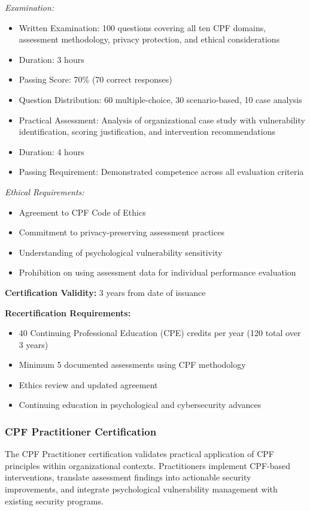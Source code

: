 \documentclass[11pt,a4paper]{article}
\begin{document}
\textit{Examination:}
\begin{itemize}
\item Written Examination: 100 questions covering all ten CPF domains, assessment methodology, privacy protection, and ethical considerations
\item Duration: 3 hours
\item Passing Score: 70\% (70 correct responses)
\item Question Distribution: 60 multiple-choice, 30 scenario-based, 10 case analysis
\item Practical Assessment: Analysis of organizational case study with vulnerability identification, scoring justification, and intervention recommendations
\item Duration: 4 hours
\item Passing Requirement: Demonstrated competence across all evaluation criteria
\end{itemize}

\textit{Ethical Requirements:}
\begin{itemize}
\item Agreement to CPF Code of Ethics
\item Commitment to privacy-preserving assessment practices
\item Understanding of psychological vulnerability sensitivity
\item Prohibition on using assessment data for individual performance evaluation
\end{itemize}

\textbf{Certification Validity:} 3 years from date of issuance

\textbf{Recertification Requirements:}
\begin{itemize}
\item 40 Continuing Professional Education (CPE) credits per year (120 total over 3 years)
\item Minimum 5 documented assessments using CPF methodology
\item Ethics review and updated agreement
\item Continuing education in psychological and cybersecurity advances
\end{itemize}

\subsubsection{CPF Practitioner Certification}

The CPF Practitioner certification validates practical application of CPF principles within organizational contexts. Practitioners implement CPF-based interventions, translate assessment findings into actionable security improvements, and integrate psychological vulnerability management with existing security programs.
\end{document}
